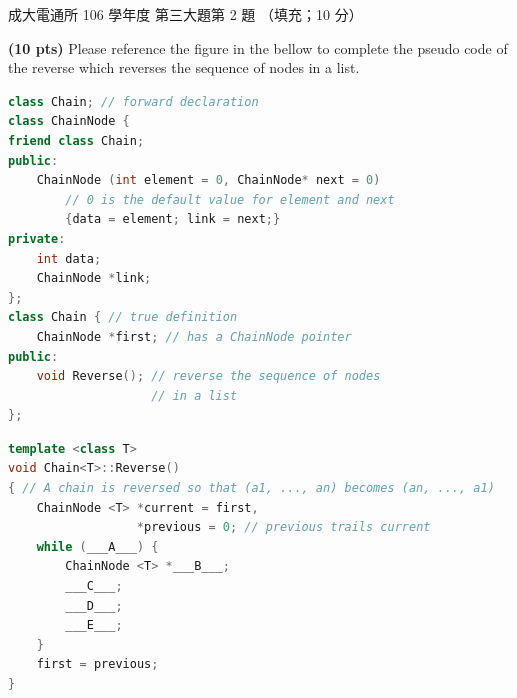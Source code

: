 \begin{pastexam}[label={px:ncku-106-cce-ds-09}]{成大電通所 106 學年度 第三大題第 2 題}
（填充；10 分）

\textbf{(10 pts)} Please reference the figure in the bellow to complete the pseudo code of the
reverse which reverses the sequence of nodes in a list.
\begin{lstlisting}[language=C++, basicstyle=\ttfamily\small, columns=fullflexible, keepspaces=true]
class Chain; // forward declaration
class ChainNode {
friend class Chain;
public:
    ChainNode (int element = 0, ChainNode* next = 0)
        // 0 is the default value for element and next
        {data = element; link = next;}
private:
    int data;
    ChainNode *link;
};
class Chain { // true definition
    ChainNode *first; // has a ChainNode pointer
public:
    void Reverse(); // reverse the sequence of nodes
                    // in a list
};
\end{lstlisting}

\begin{center}
\end{center}

\begin{lstlisting}[language=C++, basicstyle=\ttfamily\small, columns=fullflexible, keepspaces=true]
template <class T>
void Chain<T>::Reverse()
{ // A chain is reversed so that (a1, ..., an) becomes (an, ..., a1)
    ChainNode <T> *current = first,
                  *previous = 0; // previous trails current
    while (___A___) {
        ChainNode <T> *___B___;
        ___C___;
        ___D___;
        ___E___;
    }
    first = previous;
}
\end{lstlisting}
\end{pastexam}

